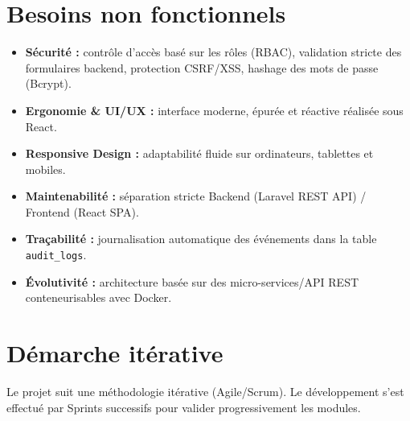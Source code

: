 \documentclass[12pt,a4paper]{report}
\begin{document}
\section{Besoins non fonctionnels}
\begin{itemize}
    \item \textbf{Sécurité :} contrôle d'accès basé sur les rôles (RBAC), validation stricte des formulaires backend, protection CSRF/XSS, hashage des mots de passe (Bcrypt).
    \item \textbf{Ergonomie \& UI/UX :} interface moderne, épurée et réactive réalisée sous React.
    \item \textbf{Responsive Design :} adaptabilité fluide sur ordinateurs, tablettes et mobiles.
    \item \textbf{Maintenabilité :} séparation stricte Backend (Laravel REST API) / Frontend (React SPA).
    \item \textbf{Traçabilité :} journalisation automatique des événements dans la table \texttt{audit\_logs}.
    \item \textbf{Évolutivité :} architecture basée sur des micro-services/API REST conteneurisables avec Docker.
\end{itemize}

\section{Démarche itérative}
Le projet suit une méthodologie itérative (Agile/Scrum). Le développement s'est effectué par Sprints successifs pour valider progressivement les modules.
\end{document}
